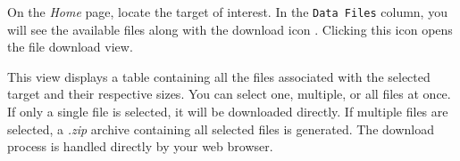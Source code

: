 

On the \textsl{Home} page, locate the target of interest. In the \texttt{Data Files} column, you will see the available files along with the download icon {\scriptsize \grayblue{\faDownload{}}}. Clicking this icon opens the file download view.


This view displays a table containing all the files associated with the selected target and their respective sizes. You can select one, multiple, or all files at once. If only a single file is selected, it will be downloaded directly. If multiple files are selected, a \textsl{.zip} archive containing all selected files is generated. The download process is handled directly by your web browser.